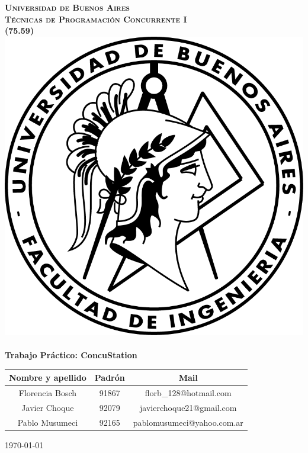 \begin{titlepage}
\begin{center}


\textsc{\LARGE \textbf{Universidad de Buenos Aires}}\\%
\vfill
\textsc{\LARGE \textbf{Técnicas de Programación Concurrente I }}\\%
\vfill
\textsc{\LARGE \textbf{(75.59)}}\\%
\vfill
\vfill
\includegraphics[scale=1.25]{./logo.png}~\\[2cm]
{ \huge \bfseries Trabajo Práctico: ConcuStation}\\%
\vfill
{\Large
\begin{tabular}{|c|c|c|}
\hline
Nombre y apellido & Padrón & Mail \\
\hline
Florencia Bosch & 91867 & florb\_128@hotmail.com \\
\hline
Javier Choque & 92079 & javierchoque21@gmail.com \\
\hline
Pablo Musumeci & 92165 & pablomusumeci@yahoo.com.ar\\
\hline
\end{tabular}
}
\vfill

{\large \today}

\end{center}
\end{titlepage}
